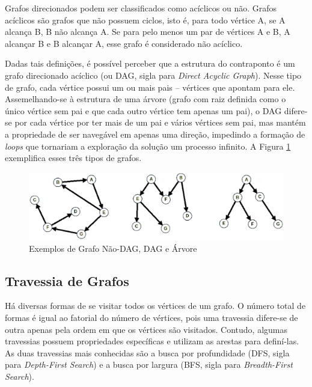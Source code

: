       Grafos direcionados podem ser classificados como acíclicos ou não. Grafos acíclicos são grafos que não possuem ciclos, isto é, para todo vértice A, se A alcança B, B não alcança A. Se para pelo menos um par de vértices A e B, A alcançar B e B alcançar A, esse grafo é considerado não acíclico.

      Dadas tais definições, é possível perceber que a estrutura do contraponto é um grafo direcionado acíclico (ou DAG, sigla para \textit{Direct Acyclic Graph}). Nesse tipo de grafo, cada vértice possui um ou mais pais -- vértices que apontam para ele. Assemelhando-se à estrutura de uma árvore (grafo com raiz definida como o único vértice sem pai e que cada outro vértice tem apenas um pai), o DAG difere-se por cada vértice por ter mais de um pai e vários vértices sem pai, mas mantém a propriedade de ser navegável em apenas uma direção, impedindo a formação de \textit{loops} que tornariam a exploração da solução um processo infinito. A Figura \ref{naodagdagarvore} exemplifica esses três tipos de grafos.

      \begin{figure}[htb]
        \centering
        \includegraphics[scale=0.47]{figuras/naodagdagarvore.eps}
        \caption{Exemplos de Grafo Não-DAG, DAG e Árvore}
        \label{naodagdagarvore}
      \end{figure}

    \subsection[Travessia de Grafos]{Travessia de Grafos}

      Há diversas formas de se visitar todos os vértices de um grafo. O número total de formas é igual ao fatorial do número de vértices, pois uma travessia difere-se de outra apenas pela ordem em que os vértices são visitados. Contudo, algumas travessias possuem propriedades específicas e utilizam as arestas para definí-las. As duas travessias mais conhecidas são a busca por profundidade (DFS, sigla para \textit{Depth-First Search}) e a busca por largura (BFS, sigla para \textit{Breadth-First Search}).

